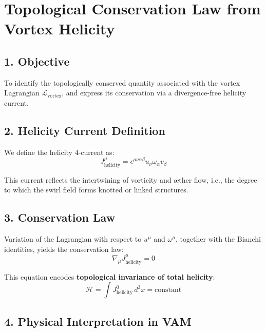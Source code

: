 \documentclass[twocolumn,aps,pre,floatfix,nofootinbib]{revtex4-2}
\begin{document}
    \section*{Topological Conservation Law from Vortex Helicity}

    \subsection*{1. Objective}

    To identify the topologically conserved quantity associated with the vortex Lagrangian \( \mathcal{L}_{\text{vortex}} \), and express its conservation via a divergence-free helicity current.

    \subsection*{2. Helicity Current Definition}

    We define the helicity 4-current as:
    \begin{equation}
        J^\mu_{\text{helicity}} = \epsilon^{\mu\nu\alpha\beta} u_\nu \omega_\alpha v_\beta
    \end{equation}

    This current reflects the intertwining of vorticity and æther flow, i.e., the degree to which the swirl field forms knotted or linked structures.

    \subsection*{3. Conservation Law}

    Variation of the Lagrangian with respect to \( u^\mu \) and \( \omega^\mu \), together with the Bianchi identities, yields the conservation law:
    \begin{equation}
        \nabla_\mu J^\mu_{\text{helicity}} = 0
    \end{equation}

    This equation encodes \textbf{topological invariance of total helicity}:
    \begin{equation}
        \mathcal{H} = \int J^0_{\text{helicity}} \, d^3x = \text{constant}
    \end{equation}

    \subsection*{4. Physical Interpretation in VAM}
\end{document}
